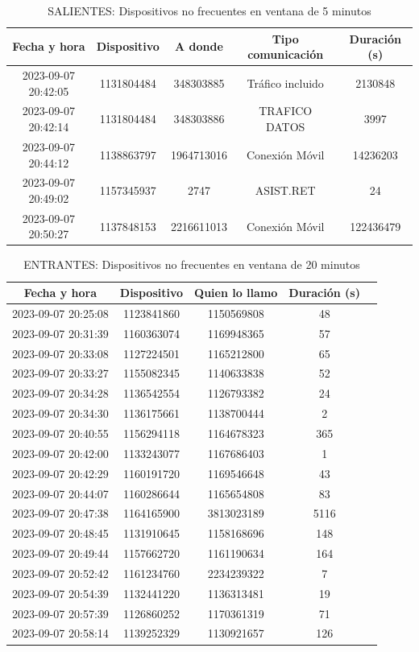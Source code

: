 \documentclass[12pt]{report}
\begin{document}
	\begin{table}[h]
		\centering
		\begin{tabular}{|c|c|c|c|c|}
			\hline
			Fecha y hora & Dispositivo & A donde &  Tipo comunicación & Duración (s)  \\
			\hline
			2023-09-07 20:42:05 & 1131804484 & 348303885 & Tráfico incluido & 2130848\\
			2023-09-07 20:42:14 & 1131804484 & 348303886 & TRAFICO DATOS & 3997\\
			2023-09-07 20:44:12 & 1138863797 & 1964713016 & Conexión Móvil & 14236203\\
			2023-09-07 20:49:02 & 1157345937 & 2747 & ASIST.RET & 24\\
			2023-09-07 20:50:27 & 1137848153 & 2216611013 & Conexión Móvil & 122436479\\
			\hline
		\end{tabular}
		\caption{SALIENTES: Dispositivos no frecuentes en ventana de 5 minutos}
		\label{tab:t4}
	\end{table}
	\begin{table}[h]
		\centering
		\begin{tabular}{|c|c|c|c|c|}
			\hline
			Fecha y hora & Dispositivo & Quien lo llamo & Duración (s)  \\
			\hline
			2023-09-07 20:25:08 & 1123841860 & 1150569808  & 48\\
			2023-09-07 20:31:39 & 1160363074 & 1169948365  & 57\\
			2023-09-07 20:33:08 & 1127224501 & 1165212800  & 65 \\
			2023-09-07 20:33:27 & 1155082345 & 1140633838  & 52   \\
			2023-09-07 20:34:28 & 1136542554 & 1126793382  & 24   \\
			2023-09-07 20:34:30 & 1136175661 & 1138700444  & 2   \\
			2023-09-07 20:40:55 & 1156294118 & 1164678323  & 365   \\
			2023-09-07 20:42:00 & 1133243077 & 1167686403  & 1   \\
			2023-09-07 20:42:29 & 1160191720 & 1169546648  & 43   \\
			2023-09-07 20:44:07 & 1160286644 & 1165654808  & 83   \\
			2023-09-07 20:47:38 & 1164165900 & 3813023189  & 5116   \\
			2023-09-07 20:48:45 & 1131910645 & 1158168696  & 148   \\
			2023-09-07 20:49:44 & 1157662720 & 1161190634  & 164   \\
			2023-09-07 20:52:42 & 1161234760 & 2234239322  & 7   \\
			2023-09-07 20:54:39 & 1132441220 & 1136313481  & 19   \\
			2023-09-07 20:57:39 & 1126860252 & 1170361319  & 71   \\
			2023-09-07 20:58:14 & 1139252329 & 1130921657  & 126   \\
			\hline
		\end{tabular}
		\caption{ENTRANTES: Dispositivos no frecuentes en ventana de 20 minutos}
		\label{tab:t5}
	\end{table}
\end{document}

